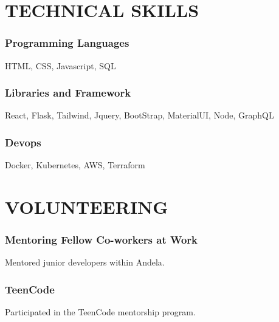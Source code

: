 \documentclass{article}
\begin{document}
\section{TECHNICAL SKILLS}
\subsubsection{Programming Languages}
HTML, CSS, Javascript, SQL
\subsubsection{Libraries and Framework}
React, Flask, Tailwind, Jquery, BootStrap, MaterialUI, Node, GraphQL
\subsubsection{Devops}
Docker, Kubernetes, AWS, Terraform
\section{VOLUNTEERING}
\subsubsection{Mentoring Fellow Co-workers at Work}
\begin{description}[font=$\bullet$~\normalfont\scshape\color{red!50!black}]
  \item{Mentored junior developers within Andela.}
\end{description}
\subsubsection{TeenCode}
\begin{description}[font=$\bullet$~\normalfont\scshape\color{red!50!black}]
  \item{Participated in the TeenCode mentorship program.}
\end{description}
\end{document}
